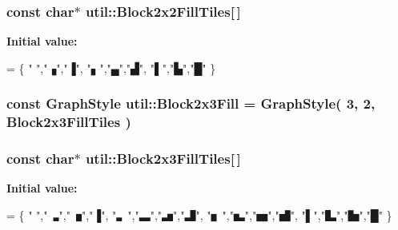 \hypertarget{namespaceutil_ace53fa0f67b73a009ecfcd213f2a9c4b}{
\subsubsection[{Block2x2\-Fill\-Tiles}]{\setlength{\rightskip}{0pt plus 5cm}const char$\ast$ util\-::\-Block2x2\-Fill\-Tiles\mbox{[}$\,$\mbox{]}}}\label{namespaceutil_ace53fa0f67b73a009ecfcd213f2a9c4b}
{\bfseries Initial value\-:}
\begin{DoxyCode}
= \{
    \textcolor{stringliteral}{" "},\textcolor{stringliteral}{"▗"},\textcolor{stringliteral}{"▐"},
    \textcolor{stringliteral}{"▖"},\textcolor{stringliteral}{"▄"},\textcolor{stringliteral}{"▟"},
    \textcolor{stringliteral}{"▌"},\textcolor{stringliteral}{"▙"},\textcolor{stringliteral}{"█"}
\}
\end{DoxyCode}
\hypertarget{namespaceutil_a9871fe0a0bcec6ff6079b0cfb42e83c2}{
\subsubsection[{Block2x3\-Fill}]{\setlength{\rightskip}{0pt plus 5cm}const {\bf Graph\-Style} util\-::\-Block2x3\-Fill = {\bf Graph\-Style}( 3, 2, {\bf Block2x3\-Fill\-Tiles} )}}\label{namespaceutil_a9871fe0a0bcec6ff6079b0cfb42e83c2}
\hypertarget{namespaceutil_a1d4b23eb34b2077834e0f7c515fef3bd}{
\subsubsection[{Block2x3\-Fill\-Tiles}]{\setlength{\rightskip}{0pt plus 5cm}const char$\ast$ util\-::\-Block2x3\-Fill\-Tiles\mbox{[}$\,$\mbox{]}}}\label{namespaceutil_a1d4b23eb34b2077834e0f7c515fef3bd}
{\bfseries Initial value\-:}
\begin{DoxyCode}
= \{
    \textcolor{stringliteral}{" "},\textcolor{stringliteral}{"🬞"},\textcolor{stringliteral}{"🬦"},\textcolor{stringliteral}{"▐"},
    \textcolor{stringliteral}{"🬏"},\textcolor{stringliteral}{"🬭"},\textcolor{stringliteral}{"🬵"},\textcolor{stringliteral}{"🬷"},
    \textcolor{stringliteral}{"🬓"},\textcolor{stringliteral}{"🬱"},\textcolor{stringliteral}{"🬹"},\textcolor{stringliteral}{"🬻"},
    \textcolor{stringliteral}{"▌"},\textcolor{stringliteral}{"🬲"},\textcolor{stringliteral}{"🬺"},\textcolor{stringliteral}{"█"}
\}
\end{DoxyCode}
